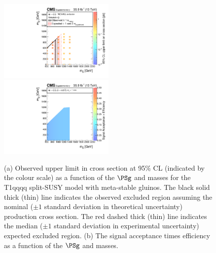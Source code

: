 \clearpage
\begin{figure}
    \begin{center}
            \includegraphics[width=0.50\textwidth]{Supplementary/T1qqqqLLStableXSEC}
	    \includegraphics[width=0.50\textwidth]{Supplementary/T1qqqqLL_ctau_1e18_efficiency_aux}
        \caption{ (a) Observed upper limit in cross section at 95\% CL (indicated
        by the colour scale) as a function of 
        the $\PSg$ and \PSGczDo %
        masses for the 
        T1qqqq split-SUSY model with meta-stable gluinos. 
         The  black  solid thick  (thin)  line indicates  the
        observed  excluded  region  assuming   the  nominal  (${\pm}1$  standard
        deviation in theoretical uncertainty)  production cross section. The red
        dashed  thick  (thin)  line  indicates  the  median  (${\pm}1$  standard
        deviation in experimental uncertainty) expected excluded region.
        (b) The signal acceptance times efficiency as a function of 
        the $\PSg$ and \PSGczDo %
        masses.
        }
        \label{fig:T1qqqqLL}
    \end{center}
\end{figure}

